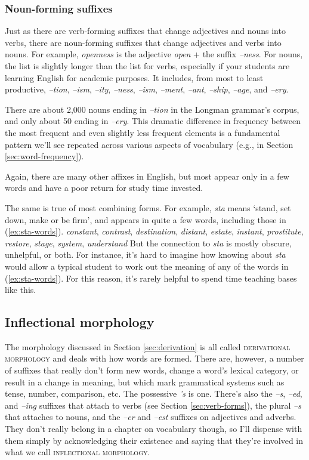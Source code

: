 \subsubsection*{Noun-forming suffixes}
Just as there are verb-forming suffixes that change adjectives and nouns into verbs, there are noun-forming suffixes that change adjectives and verbs into nouns. For example, \textit{openness} is the adjective \textit{open} + the suffix \textit{--ness}. For nouns, the list is slightly longer than the list for verbs, especially if your students are learning English for academic purposes. It includes, from most to least productive, \textit{--tion}, \textit{--ism}, \textit{--ity}, \textit{--ness}, \textit{--ism}, \textit{--ment}, \textit{--ant}, \textit{--ship}, \textit{--age}, and \textit{--ery}.

There are about 2,000 nouns ending in \textit{--tion} in the Longman grammar's corpus, and only about 50 ending in \textit{--ery}. This dramatic difference in frequency between the most frequent and even slightly less frequent elements is a fundamental pattern we'll see repeated across various aspects of vocabulary (e.g., in Section \ref{sec:word-frequency}).

Again, there are many other affixes in English, but most appear only in a few words and have a poor return for study time invested.

The same is true of most combining forms. For example, \textit{sta} means `stand, set down, make or be firm', and appears in quite a few words, including those in (\ref{ex:sta-words}).
\ea\textit{constant}, \textit{contrast}, \textit{destination}, \textit{distant}, \textit{estate}, \textit{instant}, \textit{prostitute}, \textit{restore}, \textit{stage}, \textit{system}, \textit{understand}\label{ex:sta-words}
\z
\noindent But the connection to \textit{sta} is mostly obscure, unhelpful, or both. For instance, it's hard to imagine how knowing about \textit{sta} would allow a typical student to work out the meaning of any of the words in (\ref{ex:sta-words}). For this reason, it's rarely helpful to spend time teaching bases like this.

\subsection{Inflectional morphology}

The morphology discussed in Section \ref{sec:derivation} is all called \textsc{derivational morphology} and deals with how words are formed. There are, however, a number of suffixes that really don't form new words, change a word's lexical category, or result in a change in meaning, but which mark grammatical systems such as tense, number, comparison, etc. The possessive \textit{'s} is one. There's also the \textit{--s}, \textit{--ed}, and \textit{--ing} suffixes that attach to verbs (see Section \ref{sec:verb-forms}), the plural \textit{--s} that attaches to nouns, and the \textit{--er} and \textit{--est} suffixes on adjectives and adverbs. They don't really belong in a chapter on vocabulary though, so I'll dispense with them simply by acknowledging their existence and saying that they're involved in what we call \textsc{inflectional morphology}.


